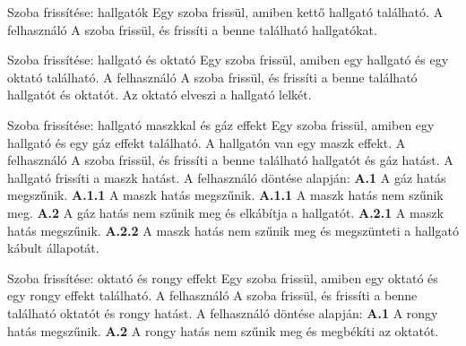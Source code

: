 \begin{use-case}
    {Szoba frissítése: hallgatók}
    {Egy szoba frissül, amiben kettő hallgató található.}
    {A felhasználó}
    A szoba frissül, és frissíti a benne található hallgatókat.
\end{use-case}

\begin{use-case}
    {Szoba frissítése: hallgató és oktató}
    {Egy szoba frissül, amiben egy hallgató és egy oktató található.}
    {A felhasználó}
    A szoba frissül, és frissíti a benne található hallgatót és oktatót. Az oktató elveszi a hallgató lelkét.
\end{use-case}

\begin{use-case}
    {Szoba frissítése: hallgató maszkkal és gáz effekt}
    {Egy szoba frissül, amiben egy hallgató és egy gáz effekt található. A hallgatón van egy maszk effekt.}
    {A felhasználó}
    A szoba frissül, és frissíti a benne található hallgatót és gáz hatást. A hallgató frissíti a maszk hatást. A felhasználó döntése alapján:
    \newline \textbf{A.1} A gáz hatás megszűnik.
    \newline    \textbf{A.1.1} A maszk hatás megszűnik.
    \newline    \textbf{A.1.1} A maszk hatás nem szűnik meg.
    \newline \textbf{A.2} A gáz hatás nem szűnik meg és elkábítja a hallgatót.
    \newline    \textbf{A.2.1} A maszk hatás megszűnik.
    \newline    \textbf{A.2.2} A maszk hatás nem szűnik meg és megszünteti a hallgató kábult állapotát.
\end{use-case}

\begin{use-case}
    {Szoba frissítése: oktató és rongy effekt}
    {Egy szoba frissül, amiben egy oktató és egy rongy effekt található.}
    {A felhasználó}
    A szoba frissül, és frissíti a benne található oktatót és rongy hatást. A felhasználó döntése alapján:
    \newline \textbf{A.1} A rongy hatás megszűnik.
    \newline \textbf{A.2} A rongy hatás nem szűnik meg és megbékíti az oktatót.
\end{use-case}

